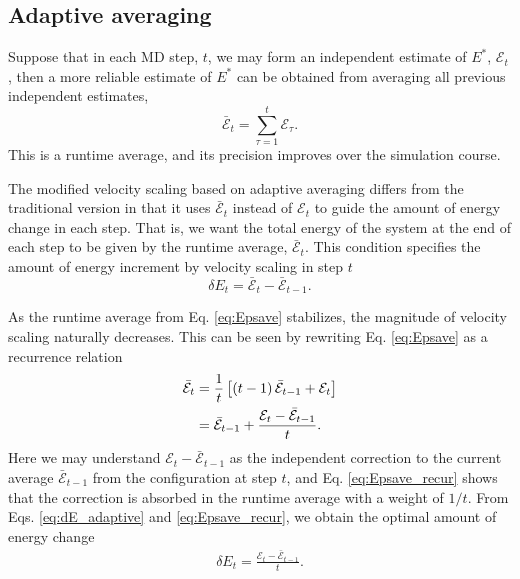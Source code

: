 \documentclass[reprint]{revtex4-1}
\begin{document}
\subsection{Adaptive averaging}



Suppose that in each MD step, $t$,
we may form an independent estimate of $E^*$,
$\mathcal E_t$,
then a more reliable estimate of $E^*$
can be obtained from averaging
all previous independent estimates,
%
\begin{equation}
  \bar{\mathcal E}_t
  =
  \sum_{\tau = 1}^t
    \mathcal E_\tau
  .
  \label{eq:Epsave}
\end{equation}
%
This is a runtime average,
and its precision improves over the simulation course.


The modified velocity scaling based on adaptive averaging
differs from the traditional version
in that it uses $\bar{\mathcal E}_t$
instead of $\mathcal E_t$
to guide the amount of energy change in each step.
%
That is, we want
the total energy of the system
at the end of each step
to be given by
the runtime average, $\bar{\mathcal E}_t$.
%
This condition specifies the amount of energy increment
by velocity scaling in step $t$
%
\begin{equation}
  \delta E_t
  =
  \bar{\mathcal E}_t - \bar{\mathcal E}_{t - 1}
  .
  \label{eq:dE_adaptive}
\end{equation}

As the runtime average from Eq. \eqref{eq:Epsave}
stabilizes, the magnitude of velocity scaling
naturally decreases.
%
This can be seen by rewriting Eq. \eqref{eq:Epsave}
as a recurrence relation
%
\begin{align}
  \bar{\mathcal E}_t
  &=
  \frac{1}{t}
  \left[
    (t - 1) \, \bar{\mathcal E}_{t - 1}
    + \mathcal E_t
  \right]
  \notag \\
  &=
  \bar{\mathcal E}_{t - 1}
  +
  \frac{
    \mathcal E_t - \bar{\mathcal E}_{t - 1}
  }
  {
    t
  }
  .
\label{eq:Epsave_recur}
\end{align}
%
Here we may understand $\mathcal E_t - \bar{\mathcal E}_{t - 1}$
as the independent correction
to the current average $\bar{\mathcal E}_{t - 1}$
from the configuration at step $t$,
and Eq. \eqref{eq:Epsave_recur} shows that
the correction is absorbed in the runtime average
with a weight of $1/t$.
%
From Eqs. \eqref{eq:dE_adaptive} and \eqref{eq:Epsave_recur},
we obtain the optimal amount of energy change
\begin{align}
  \delta E_t
  =
  \frac{ \mathcal E_t - \bar{\mathcal E}_{t - 1} }
       { t }
  .
  \label{eq:dE_opt}
\end{align}
%
\end{document}
